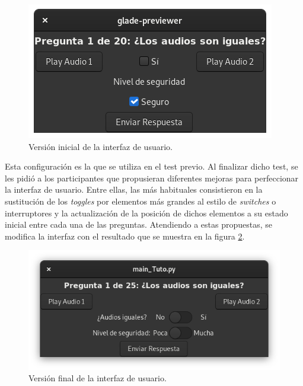 \documentclass[11pt,a4paper]{book}
\begin{document}
            \begin{figure}[H]
                \begin{center}
                    \includegraphics[scale=.6]{../imagenes/uiIni.png}
                    \caption{Versión inicial de la interfaz de usuario.}
                    \label{fig:uiIni}
                \end{center}
            \end{figure}
            
            Esta configuración es la que se utiliza en el test previo. Al finalizar dicho test, se les pidió a los participantes que propusieran diferentes mejoras para perfeccionar la interfaz de usuario. Entre ellas, las más habituales consistieron en la sustitución de los \textit{toggles} por elementos más grandes al estilo de \textit{switches} o interruptores y la actualización de la posición de dichos elementos a su estado inicial entre cada una de las preguntas.
            Atendiendo a estas propuestas, se modifica la interfaz con el resultado que se muestra en la figura \ref{fig:uiFin}.
            
            \begin{figure}
                \begin{center}
                    \includegraphics[scale=.6]{../imagenes/interFin.png}
                    \caption{Versión final de la interfaz de usuario.}
                    \label{fig:uiFin}
                \end{center}
            \end{figure}
            
\end{document}
